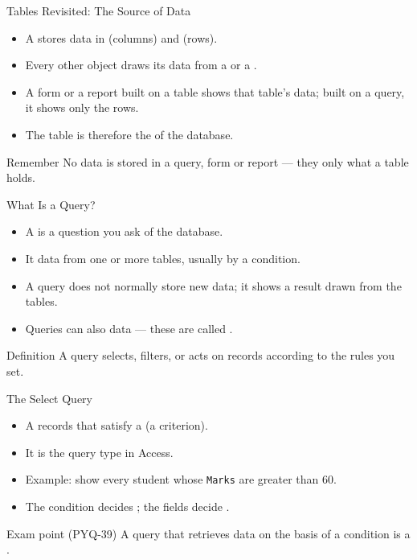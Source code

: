 \documentclass[aspectratio=169]{beamer}
\begin{document}
\begin{frame}{Tables Revisited: The Source of Data}
  \begin{itemize}
    \item A  stores data in  (columns) and
       (rows).
    \item Every other object draws its data from a  or a
      .
    \item A form or a report built on a table shows that table's data; built
      on a query, it shows only the  rows.
    \item The table is therefore the  of the database.
  \end{itemize}
  \begin{block}{Remember}
    No data is stored in a query, form or report --- they only
     what a table holds.
  \end{block}
\end{frame}

\begin{frame}{What Is a Query?}
  \begin{itemize}
    \item A  is a question you ask of the database.
    \item It  data from one or more tables, usually by a
      condition.
    \item A query does not normally store new data; it shows a result
       drawn from the tables.
    \item Queries can also  data --- these are called
      .
  \end{itemize}
  \begin{block}{Definition}
    A query selects, filters, or acts on records according to the rules you
    set.
  \end{block}
\end{frame}

\begin{frame}{The Select Query}
  \begin{itemize}
    \item A   records that satisfy a
       (a criterion).
    \item It is the  query type in Access.
    \item Example: show every student whose \texttt{Marks} are greater than
      60.
    \item The condition decides ; the fields decide
      .
  \end{itemize}
  \begin{alertblock}{Exam point (PYQ-39)}
    A query that retrieves data on the basis of a condition is a
    .
  \end{alertblock}
\end{frame}
\end{document}
